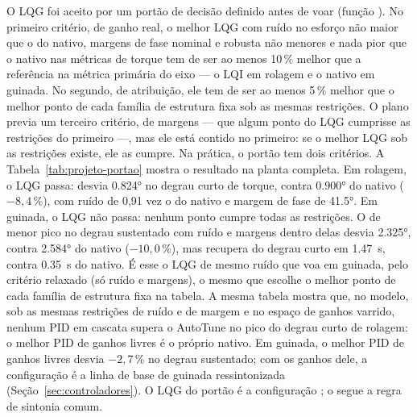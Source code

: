 O LQG foi aceito por um portão de decisão definido antes de voar (função
). No primeiro critério, de ganho real, o melhor LQG com ruído
no esforço não maior que o do nativo, margens de fase nominal e robusta não
menores e nada pior que o nativo nas métricas de torque tem de ser ao menos
10\,\% melhor que a referência na métrica primária do eixo --- o LQI em
rolagem e o nativo em guinada. No segundo, de atribuição, ele tem de ser ao
menos 5\,\% melhor que o melhor ponto de cada família de estrutura fixa sob
as mesmas restrições. O plano previa um terceiro critério, de margens --- que
algum ponto do LQG cumprisse as restrições do primeiro ---, mas ele está
contido no primeiro: se o melhor LQG sob as restrições existe, ele as cumpre.
Na prática, o portão tem dois critérios. A
Tabela~\ref{tab:projeto-portao} mostra o resultado na planta completa. Em
rolagem, o LQG passa: desvia \ang{0.824} no degrau curto de torque, contra
\ang{0.900} do nativo ($-8{,}4$\,\%), com ruído de 0,91 vez o do nativo e
margem de fase de \ang{41.5}. Em guinada, o LQG não passa: nenhum ponto
cumpre todas as restrições. O de menor pico no degrau sustentado com ruído e
margens dentro delas desvia \ang{2.325}, contra \ang{2.584} do nativo
($-10{,}0$\,\%), mas recupera do degrau curto em \SI{1.47}{\second}, contra
\SI{0.35}{\second} do nativo. É esse o LQG de mesmo ruído que voa em guinada,
pelo critério relaxado (só ruído e margens), o mesmo que escolhe o melhor
ponto de cada família de estrutura fixa na tabela. A mesma tabela mostra
que, no modelo, sob as mesmas restrições de ruído e de margem e no espaço de
ganhos varrido, nenhum PID em cascata supera o AutoTune no pico do degrau
curto de rolagem: o melhor PID de ganhos livres é o próprio nativo. Em
guinada, o melhor PID de ganhos livres desvia $-2{,}7$\,\% no degrau
sustentado; com os ganhos dele, a configuração  é a
linha de base de guinada ressintonizada (Seção~\ref{sec:controladores}). O
LQG do portão é a configuração ; o
 segue a regra de sintonia comum.

\begin{table}[htbp]
\centering
\caption{Portão de decisão: o nativo, o melhor ponto de cada família de
estrutura fixa e o LQG, na planta completa.}
\label{tab:projeto-portao}
\resizebox{\textwidth}{!}{}

\end{table}

